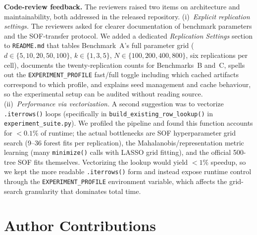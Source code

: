 \documentclass[11pt]{article}
\begin{document}
\textbf{Code-review feedback.} The reviewers raised two items on architecture and maintainability, both addressed in the released repository. (i)~\emph{Explicit replication settings.} The reviewers asked for clearer documentation of benchmark parameters and the SOF-transfer protocol. We added a dedicated \emph{Replication Settings} section to \texttt{README.md} that tables Benchmark~A's full parameter grid ($d\in\{5,10,20,50,100\}$, $k\in\{1,3,5\}$, $N\in\{100,200,400,800\}$, six replications per cell), documents the twenty-replication counts for Benchmarks~B and~C, spells out the \texttt{EXPERIMENT\_PROFILE} fast/full toggle including which cached artifacts correspond to which profile, and explains seed management and cache behaviour, so the experimental setup can be audited without reading source. (ii)~\emph{Performance via vectorization.} A second suggestion was to vectorize \texttt{.iterrows()} loops (specifically in \texttt{build\_existing\_row\_lookup()} in \texttt{experiment\_suite.py}). We profiled the pipeline and found this function accounts for $<0.1\%$ of runtime; the actual bottlenecks are SOF hyperparameter grid search (9--36 forest fits per replication), the Mahalanobis/representation metric learning (many \texttt{minimize()} calls with LASSO grid fitting), and the official 500-tree SOF fits themselves. Vectorizing the lookup would yield $<1\%$ speedup, so we kept the more readable \texttt{.iterrows()} form and instead expose runtime control through the \texttt{EXPERIMENT\_PROFILE} environment variable, which affects the grid-search granularity that dominates total time.

\section{Author Contributions}\label{sec:contributions}
\end{document}
